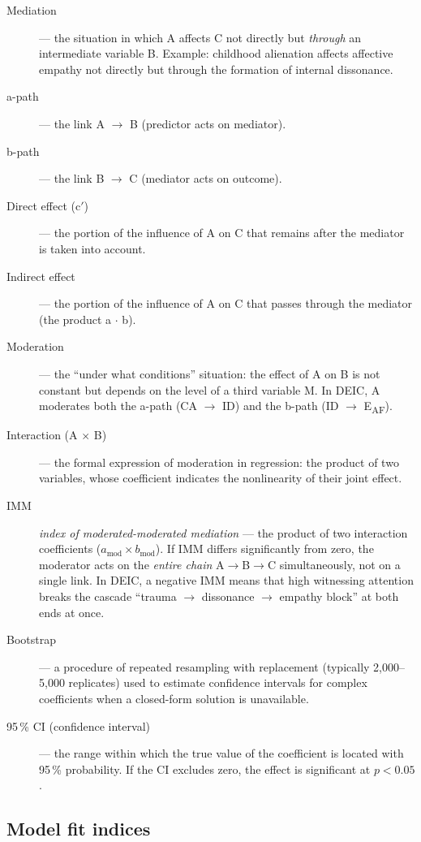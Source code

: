 \begin{description}
    \item[Mediation] --- the situation in which A affects C not directly but \emph{through} an intermediate variable B. Example: childhood alienation affects affective empathy not directly but through the formation of internal dissonance.
    \item[a-path] --- the link A $\to$ B (predictor acts on mediator).
    \item[b-path] --- the link B $\to$ C (mediator acts on outcome).
    \item[Direct effect (c$'$)] --- the portion of the influence of A on C that remains after the mediator is taken into account.
    \item[Indirect effect] --- the portion of the influence of A on C that passes through the mediator (the product a $\cdot$ b).
    \item[Moderation] --- the ``under what conditions'' situation: the effect of A on B is not constant but depends on the level of a third variable M. In DEIC, A moderates both the a-path (CA $\to$ ID) and the b-path (ID $\to$ E\textsubscript{AF}).
    \item[Interaction (A $\times$ B)] --- the formal expression of moderation in regression: the product of two variables, whose coefficient indicates the nonlinearity of their joint effect.
    \item[IMM] \textit{index of moderated-moderated mediation} --- the product of two interaction coefficients ($a_{\text{mod}} \times b_{\text{mod}}$). If IMM differs significantly from zero, the moderator acts on the \emph{entire chain} A$\to$B$\to$C simultaneously, not on a single link. In DEIC, a negative IMM means that high witnessing attention breaks the cascade ``trauma $\to$ dissonance $\to$ empathy block'' at both ends at once.
    \item[Bootstrap] --- a procedure of repeated resampling with replacement (typically 2{,}000--5{,}000 replicates) used to estimate confidence intervals for complex coefficients when a closed-form solution is unavailable.
    \item[95\,\% CI (confidence interval)] --- the range within which the true value of the coefficient is located with 95\,\% probability. If the CI excludes zero, the effect is significant at $p < 0.05$.
\end{description}

\subsection*{Model fit indices}

